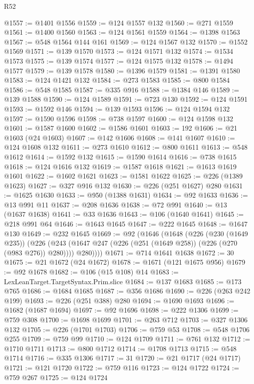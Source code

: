 \begin{lexlean}{R52}
\begin{coremodule}
@1557 := @1401 @1556
@1559 := @124 @1557 @132
@1560 := @271 @1559
@1561 := @1400 @1560
@1563 := @124 @1561 @1559
@1564 := @1398 @1563
@1567 := @548 @1564 @144 @161
@1569 := @124 @1567 @132
@1570 := @1552 @1569
@1571 := @139 @1570
@1573 := @124 @1571 @132
@1574 := @1534 @1573
@1575 := @139 @1574
@1577 := @124 @1575 @132
@1578 := @1494 @1577
@1579 := @139 @1578
@1580 := @1396 @1579
@1581 := @1391 @1580
@1583 := @124 @1421 @132
@1584 := @273 @1583
@1585 := @800 @1584
@1586 := @548 @1585
@1587 := @335 @916
@1588 := @1384 @146
@1589 := @139 @1588
@1590 := @124 @1589
@1591 := @723 @130
@1592 := @124 @1591
@1593 := @1592 @146
@1594 := @139 @1593
@1596 := @124 @1594 @132
@1597 := @1590 @1596
@1598 := @738 @1597
@1600 := @124 @1598 @132
@1601 := @1587 @1600
@1602 := @1586 @1601
@1603 := 192
@1606 := @21 @1603 (@24 @1603)
@1607 := @142 @1606
@1608 := @141 @1607
@1610 := @124 @1608 @132
@1611 := @273 @1610
@1612 := @800 @1611
@1613 := @548 @1612
@1614 := @1592 @132
@1615 := @1590 @1614
@1616 := @738 @1615
@1618 := @124 @1616 @132
@1619 := @1587 @1618
@1621 := @1613 @1619 @1601
@1622 := @1602 @1621
@1623 := @1581 @1622
@1625 := @226 (@1389 @1623)
@1627 := @327 @916 @132
@1630 := @226 (@251 @1627) @280
@1631 := @1625 @1630
@1633 := @950 (@1388 @1631)
@1634 := @92 @1633
@1636 := @13 @991 @11
@1637 := @208 @1636
@1638 := @72 @991
@1640 := @13 (@1637 @1638)
@1641 := @33 @1636
@1643 := @106 (@1640 @1641)
@1645 := @218 @991 @64
@1646 := @1643 @1645
@1647 := @222 @1645
@1648 := @1647 @130
@1649 := @232 @1645
@1669 := @92
    (@1646
      (@1648
        (@226
          (@230 (@1649 @235))
          (@226
            (@243 (@1647 @247 (@226 (@251 (@1649 @258)) (@226 (@270 (@983 @276)) @280))))
            @280))))
@1671 := @714 @1641 @1638
@1672 := 30
@1675 := @21 @1672 (@24 @1672)
@1678 := @1671 (@121 @1675 @956)
@1679 := @92 @1678
@1682 := @106 (@15 @108) @14
@1683 := LexLeanTarget.TargetSyntax.Prim.slice
@1684 := @137 @1683
@1685 := @173 @765
@1686 := @1684 @1685
@1687 := @356 @1686
@1690 := @226 (@263 @242 @199)
@1693 := @226 (@251 @388) @280
@1694 := @1690 @1693
@1696 := @1682 (@1687 @1694)
@1697 := @92 @1696
@1698 := @222 @1306
@1699 := @759 @308
@1700 := @1698 @1699
@1701 := @263 @712
@1703 := @327 @1306 @132
@1705 := @226 (@1701 @1703)
@1706 := @759 @53
@1708 := @548 @1706 @255
@1709 := @759 @99
@1710 := @124 @1709
@1711 := @761 @132
@1712 := @1710 @1711
@1713 := @800 @1712
@1714 := @1708 @1713
@1715 := @548 @1714
@1716 := @335 @1306
@1717 := 31
@1720 := @21 @1717 (@24 @1717)
@1721 := @121 @1720
@1722 := @759 @116
@1723 := @124 @1722
@1724 := @759 @267
@1725 := @124 @1724

\end{coremodule}
\end{lexlean}
